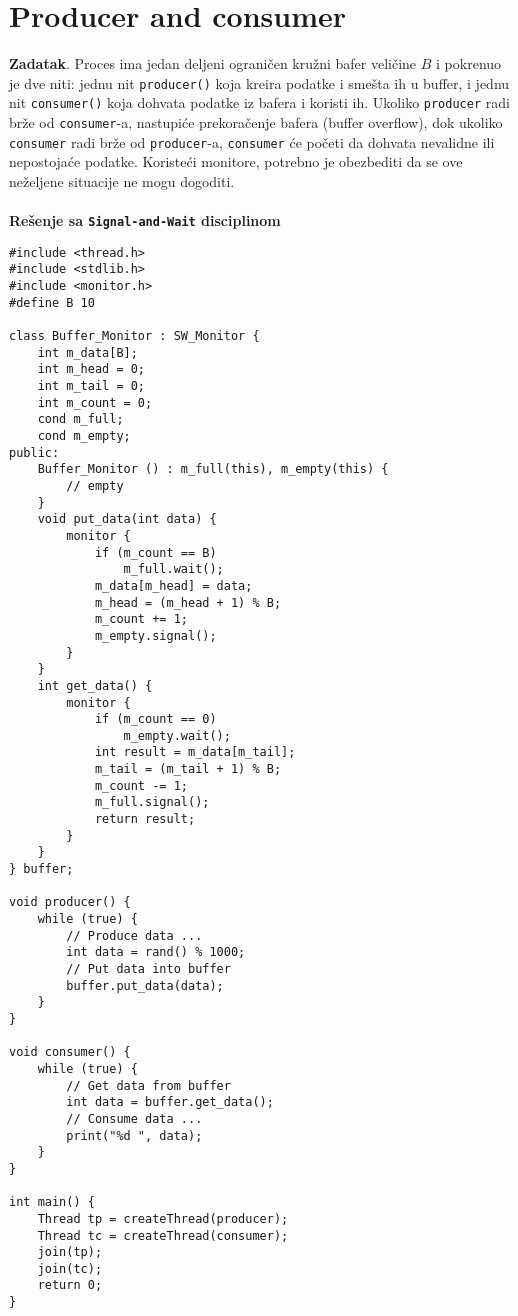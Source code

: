 \clearpage
\section{Producer and consumer}
\textbf{\large Zadatak}. Proces ima jedan deljeni ograni\v{c}en kru\v{z}ni bafer veli\v{c}ine $B$ i pokrenuo je dve niti: jednu nit \texttt{producer()} koja kreira podatke i sme\v{s}ta ih u buffer, i jednu nit \texttt{consumer()} koja dohvata podatke iz bafera i koristi ih. Ukoliko \texttt{producer} radi br\v{z}e od \texttt{consumer}-a, nastupi\'{c}e prekora\v{c}enje bafera (buffer overflow), dok ukoliko \texttt{consumer} radi br\v{z}e od \texttt{producer}-a, \texttt{consumer} \'{c}e po\v{c}eti da dohvata nevalidne ili nepostoja\'{c}e podatke. Koriste\'{c}i monitore, potrebno je obezbediti da se ove ne\v{z}eljene situacije ne mogu dogoditi.
\\\\
\textbf{Re\v{s}enje sa \texttt{Signal-and-Wait} disciplinom}
\begin{lstlisting}
#include <thread.h>
#include <stdlib.h>
#include <monitor.h>
#define B 10

class Buffer_Monitor : SW_Monitor {
    int m_data[B];
    int m_head = 0;
    int m_tail = 0;
    int m_count = 0;
    cond m_full;
    cond m_empty;
public:
    Buffer_Monitor () : m_full(this), m_empty(this) {
        // empty
    }
    void put_data(int data) {
        monitor {
            if (m_count == B)
                m_full.wait();
            m_data[m_head] = data;
            m_head = (m_head + 1) % B;
            m_count += 1;
            m_empty.signal();
        }
    }
    int get_data() {
        monitor {
            if (m_count == 0)
                m_empty.wait();
            int result = m_data[m_tail];
            m_tail = (m_tail + 1) % B;
            m_count -= 1;
            m_full.signal();
            return result;
        }
    }
} buffer;

void producer() {
    while (true) {
        // Produce data ...
        int data = rand() % 1000;
        // Put data into buffer
        buffer.put_data(data);
    }
}

void consumer() {
    while (true) {
        // Get data from buffer
        int data = buffer.get_data();
        // Consume data ...
        print("%d ", data);
    }
}

int main() {
    Thread tp = createThread(producer);
    Thread tc = createThread(consumer);
    join(tp);
    join(tc);
    return 0;
}

\end{lstlisting}
